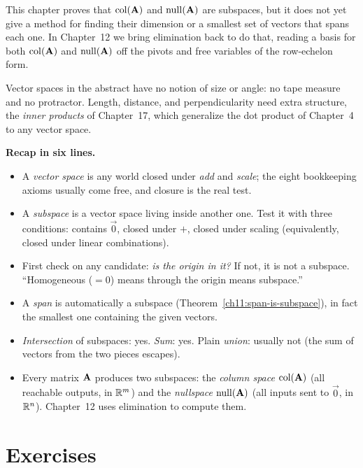 This chapter proves that $\operatorname{col}(\mathbf{A})$ and $\operatorname{null}(\mathbf{A})$ are subspaces, but it does
not yet give a method for finding their dimension or a smallest set of vectors that spans
each one. In Chapter~12 we bring elimination back to do that, reading a basis for
both $\operatorname{col}(\mathbf{A})$ and $\operatorname{null}(\mathbf{A})$ off the pivots and free variables of the
row-echelon form.

\begin{connectionbox}
Vector spaces in the abstract have no notion of size or angle: no tape
measure and no protractor. Length, distance, and perpendicularity need extra structure,
the \emph{inner products} of Chapter~17, which generalize the dot product of Chapter~4 to
any vector space.
\end{connectionbox}

\begin{recoverybox}
\textbf{Recap in six lines.}
\begin{itemize}
  \item A \emph{vector space} is any world closed under \emph{add} and \emph{scale}; the
  eight bookkeeping axioms usually come free, and closure is the real test.
  \item A \emph{subspace} is a vector space living inside another one. Test it with three
  conditions: contains $\vec{0}$, closed under $+$, closed under scaling (equivalently,
  closed under linear combinations).
  \item First check on any candidate: \emph{is the origin in it?} If not, it is not a
  subspace. ``Homogeneous ($=0$) means through the origin means subspace.''
  \item A \emph{span} is automatically a subspace (Theorem~\ref{ch11:span-is-subspace}), in
  fact the smallest one containing the given vectors.
  \item \emph{Intersection} of subspaces: yes. \emph{Sum}: yes. Plain \emph{union}:
  usually not (the sum of vectors from the two pieces escapes).
  \item Every matrix $\mathbf{A}$ produces two subspaces: the \emph{column space}
  $\operatorname{col}(\mathbf{A})$ (all reachable outputs, in $\mathbb{R}^m$) and the \emph{nullspace}
  $\operatorname{null}(\mathbf{A})$ (all inputs sent to $\vec{0}$, in $\mathbb{R}^n$). Chapter~12 uses
  elimination to compute them.
\end{itemize}
\end{recoverybox}

\section*{Exercises}


